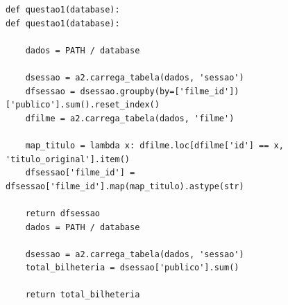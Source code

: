 \documentclass{article}
\begin{document}
\linespread{1}
\begin{lstlisting}
def questao1(database):
def questao1(database):
    
    dados = PATH / database

    dsessao = a2.carrega_tabela(dados, 'sessao')
    dfsessao = dsessao.groupby(by=['filme_id'])['publico'].sum().reset_index() 
    dfilme = a2.carrega_tabela(dados, 'filme')
    
    map_titulo = lambda x: dfilme.loc[dfilme['id'] == x, 'titulo_original'].item() 
    dfsessao['filme_id'] =  dfsessao['filme_id'].map(map_titulo).astype(str)
    
    return dfsessao
    dados = PATH / database

    dsessao = a2.carrega_tabela(dados, 'sessao')
    total_bilheteria = dsessao['publico'].sum()

    return total_bilheteria
\end{lstlisting}
\linespread{1.5}
\end{document}
